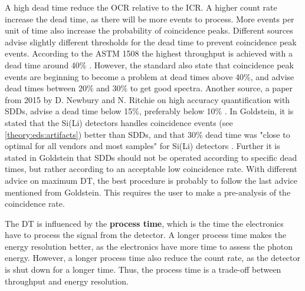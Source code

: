 A high dead time reduce the OCR relative to the ICR.
A higher count rate increase the dead time, as there will be more events to process.
More events per unit of time also increase the probability of coincidence peaks.
Different sources advise slightly different thresholds for the dead time to prevent coincidence peak events.
According to the ASTM 1508 the highest throughput is achieved with a dead time around 40\% \cite{astm_e1508_eds_quantification}.
However, the standard also state that coincidence peak events are beginning to become a problem at dead times above 40\%, and advise dead times between 20\% and 30\% to get good spectra.
Another source, a paper from 2015 by D. Newbury and N. Ritchie on high accuracy quantification with SDDs, advise a dead time below 15\%, preferably below 10\% \cite{newbury_deadtime_2014}.
In Goldstein, it is stated that the Si(Li) detectors handles coincidence events (see \cref{theory:eds:artifacts}) better than SDDs, and that 30\% dead time was "close to optimal for all vendors and most samples" for Si(Li) detectors \cite[p. 466]{goldstein_scanning_2018}.
Further it is stated in Goldstein that SDDs should not be operated according to specific dead times, but rather according to an acceptable low coincidence rate.
With different advice on maximum DT, the best procedure is probably to follow the last advice mentioned from Goldstein.
This requires the user to make a pre-analysis of the coincidence rate.


The DT is influenced by the \textbf{process time}, which is the time the electronics have to process the signal from the detector.
A longer process time makes the energy resolution better, as the electronics have more time to assess the photon energy.
However, a longer process time also reduce the count rate, as the detector is shut down for a longer time.
Thus, the process time is a trade-off between throughput and energy resolution.


